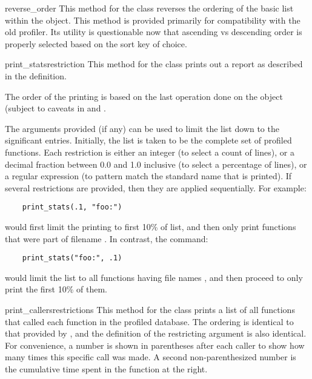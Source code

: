 \begin{funcdesc}{reverse_order}{}
This method for the  class reverses the ordering of the basic
list within the object.  This method is provided primarily for
compatibility with the old profiler.  Its utility is questionable
now that ascending vs descending order is properly selected based on
the sort key of choice.
\end{funcdesc}

\begin{funcdesc}{print_stats}{restriction}
This method for the  class prints out a report as described
in the  definition.

The order of the printing is based on the last 
operation done on the object (subject to caveats in  and
.

The arguments provided (if any) can be used to limit the list down to
the significant entries.  Initially, the list is taken to be the
complete set of profiled functions.  Each restriction is either an
integer (to select a count of lines), or a decimal fraction between
0.0 and 1.0 inclusive (to select a percentage of lines), or a regular
expression (to pattern match the standard name that is printed).  If
several restrictions are provided, then they are applied sequentially.
For example:

\begin{verbatim}
    print_stats(.1, "foo:")
\end{verbatim}

would first limit the printing to first 10\% of list, and then only
print functions that were part of filename .  In
contrast, the command:

\begin{verbatim}
    print_stats("foo:", .1)
\end{verbatim}

would limit the list to all functions having file names ,
and then proceed to only print the first 10\% of them.
\end{funcdesc}


\begin{funcdesc}{print_callers}{restrictions}
This method for the  class prints a list of all functions
that called each function in the profiled database.  The ordering is
identical to that provided by , and the definition
of the restricting argument is also identical.  For convenience, a
number is shown in parentheses after each caller to show how many
times this specific call was made.  A second non-parenthesized number
is the cumulative time spent in the function at the right.
\end{funcdesc}

